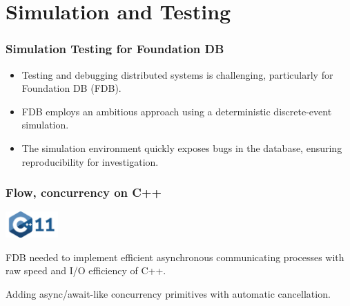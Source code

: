 \section{Simulation and Testing }

\begin{frame}
    \frametitle{Simulation Testing for Foundation DB}
    \begin{itemize}
        \item Testing and debugging distributed systems is challenging, particularly for Foundation DB (FDB).
        \item FDB employs an ambitious approach using a deterministic discrete-event simulation.
        \item The simulation environment quickly exposes bugs in the database, ensuring reproducibility for investigation.
    \end{itemize}
\end{frame}

\begin{frame}
    \frametitle{Flow, concurrency on C++}
    \includegraphics[width=2cm]{img/3-Testing/cpp.png}

    \vspace{0.5cm}
   FDB needed to implement efficient asynchronous communicating processes with raw speed and I/O efficiency of C++.
\vspace{0.5cm}

Adding async/await-like
concurrency primitives with automatic cancellation.

   
\end{frame}

